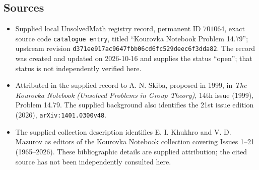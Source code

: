 \documentclass[11pt]{article}
\begin{document}
\subsection{Sources}
\begin{itemize}
\item Supplied local UnsolvedMath registry record, permanent ID \(701064\), exact source code \texttt{catalogue entry}, titled ``Kourovka Notebook Problem 14.79''; upstream revision \texttt{d371ee917ac9647fbb06cd6fc529deec6f3dda82}. The record was created and updated on 2026-10-16 and supplies the status ``open''; that status is not independently verified here.
\item Attributed in the supplied record to A. N. Skiba, proposed in 1999, in \emph{The Kourovka Notebook (Unsolved Problems in Group Theory)}, 14th issue (1999), Problem 14.79. The supplied background also identifies the 21st issue edition (2026), \texttt{arXiv:1401.0300v48}.
\item The supplied collection description identifies E. I. Khukhro and V. D. Mazurov as editors of the Kourovka Notebook collection covering Issues 1--21 (1965--2026). These bibliographic details are supplied attribution; the cited source has not been independently consulted here.
\end{itemize}
\end{document}
